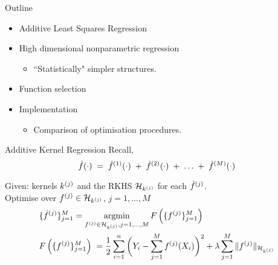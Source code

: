 \begin{frame}{Outline}

  \begin{itemize}
    \item Additive Least Squares Regression
    \vspace{0.1in}
    \item High dimensional nonparametric regression
      \begin{itemize}
        \item ``Statistically" simpler structures.
      \end{itemize}
    \vspace{0.1in}
    \item Function selection
    \vspace{0.1in}
    \item Implementation
      \begin{itemize}
        \item Comparison of optimisation procedures.
      \end{itemize}
  \end{itemize}

\end{frame}


\begin{frame}{Additive Kernel Regression}
Recall,
  \[
    \hat{f}(\cdot) \;=\; \hat{f}^{(1)}(\cdot)\; +\;  
      \hat{f}^{(2)}(\cdot)\;+\;\dots \;+\; \hat{f}^{(M)}(\cdot)
  \]
\pause
\vspace{0.1in}

Given: kernels $k^{(j)}$ and the RKHS ${{\mathcal{H}_{k^{(j)}}}}$ for each $\hat{f}^{(j)}$. \\
Optimise over $f^{(j)} \in {{\mathcal{H}_{k^{(j)}}}}$, $j = 1,\dots,M$
\vspace{0.1in}
\pause
  \begin{align*}
  & \{\hat{f}^{(j)}\}_{j=1}^M =
  \mathop{\mathrm{argmin}}_{f^{(j)} \in {{\mathcal{H}_{k^{(j)}}}}, j = 1,\dots, M} 
    F\left( \{f^{(j)}\}_{j=1}^M \right) \\
  & F\left( \{f^{(j)}\}_{j=1}^M \right)  \;=  
    \frac{1}{2}\sum_{i=1}^n \bigg(Y_i - \sum_{j=1}^M f^{(j)} (X_i) \bigg)^2 
   + \lambda \sum_{j=1}^M \|f^{(j)}\|_{{\mathcal{H}_{k^{(j)}}}} 
  \end{align*}

\end{frame}


